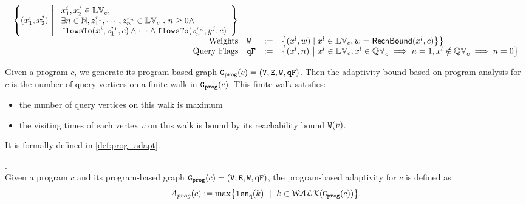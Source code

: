 \begin{defn}
\[\begin{array}{rlcl}
\left\{ 
  ({x}_1^{i}, {x}_2^{j}) 
  ~ \middle\vert ~
  \begin{array}{l}
    {x}_1^{i}, {x}_2^{j} \in \lvar_{{c}},
    \\
    \exists n \in \mathbb{N}, z_1^{r_1}, \cdots, z_n^{r_n} \in \lvar_{{c}} \st 
    n \geq 0 \land
    \\
    \flowsto(x^i,  z_1^{r_1}, c) 
    \land \cdots \land \flowsto(z_n^{r_n}, y^j, c) 
  \end{array}
\right\}
\\
\text{Weights} &
\weights & := &
	\big\{ (x^l, w)
	\mid
	x^l \in \lvar_{{c}}, w = \rb(x^l, c)
	\big\} 
	\big\}
\\
\text{Query Flags} &
\qflag & := & 
\left\{(x^l, n)   
~ \middle\vert ~
 x^l \in \lvar_{c},
 x^l \in \qvar_{c} \implies n = 1,
 x^l \notin \qvar_{c} \implies n = 0
\right\}
\end{array}
\]
\end{defn} 
%
Given a program ${c}$, we generate its program-based graph 
$\mathtt{{G_{prog}}}({c}) = (\mathtt{V}, \mathtt{E}, \mathtt{W}, \mathtt{qF})$.
%
Then the adaptivity bound based on program analysis for ${c}$ is the number of query vertices on a finite walk in $\mathtt{{G_{prog}}}({c})$. This finite walk satisfies:
\begin{itemize}
\item the number of query vertices on this walk is maximum
\item the visiting times of each vertex $v$ on this walk is bound by its reachability bound $\mathtt{W}(v)$.
\end{itemize}
It is formally defined in \ref{def:prog_adapt}.
%
%
\begin{defn}
.
\label{def:prog_adapt}
\\
{
Given a program ${c}$ and its program-based graph 
$\mathtt{{G_{prog}}}({c}) = (\mathtt{V}, \mathtt{E}, \mathtt{W}, \mathtt{qF})$,
%
the program-based adaptivity for $c$ is defined as%
\[
\progA({c}) 
:= \max
\left\{ \qlen(k)\ \mid \  k\in \walks(\progG({c}))\right \}.
\]
}
\end{defn}  
